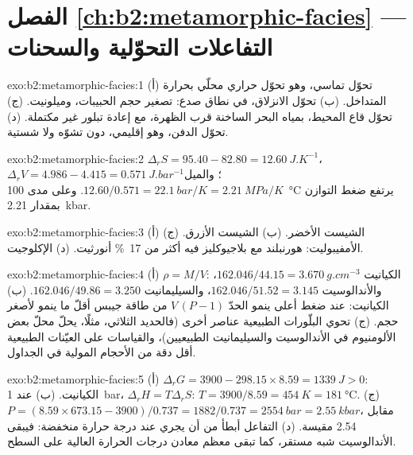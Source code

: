 \section*{الفصل \ref{ch:b2:metamorphic-facies} --- التفاعلات التحوّلية والسحنات}

\begin{solution}{exo:b2:metamorphic-facies:1}
(أ) تحوّل تماسي، وهو تحوّل حراري محلّي بحرارة المتداخل.
(ب) تحوّل الانزلاق، في نطاق صدع: تصغير حجم الحبيبات، وميلونيت.
(ج) تحوّل قاع المحيط، بمياه البحر الساخنة قرب الظهرة، مع إعادة تبلور
غير مكتملة. (د) تحوّل الدفن، وهو إقليمي، دون تشوّه ولا
شستية.
\end{solution}

\begin{solution}{exo:b2:metamorphic-facies:2}
$\Delta_r S = 95.40 - 82.80 = \qty{12.60}{J.K^{-1}}$، $\Delta_r V = 4.986 - 4.415 =
\qty{0.571}{J.bar^{-1}}$؛ والميل $12.60/0.571 = \qty{22.1}{bar/K} = \qty{2.21}{MPa/K}$.
وعلى مدى \qty{100}{\celsius} يرتفع ضغط التوازن بمقدار \qty{2.21}{kbar}.
\end{solution}

\begin{solution}{exo:b2:metamorphic-facies:3}
(أ) الشيست الأخضر. (ب) الشيست الأزرق. (ج) الأمفيبوليت: هورنبلند مع بلاجيوكليز فيه أكثر
من \qty{17}{\percent} أنورثيت. (د) الإكلوجيت.
\end{solution}

\begin{solution}{exo:b2:metamorphic-facies:4}
(أ) $\rho = M/V$: الكيانيت $162.046/44.15 = \qty{3.670}{g.cm^{-3}}$، والأندالوسيت
$162.046/51.52 = 3.145$، والسيليمانيت $162.046/49.86 = 3.250$. (ب) الكيانيت: عند ضغط
أعلى ينمو الحدّ $V\,(P - 1)$ من طاقة جيبس أقلّ ما ينمو لأصغر حجم.
(ج) تحوي البلّورات الطبيعية عناصر أخرى (فالحديد الثلاثي، مثلًا، يحلّ محلّ بعض
الألومنيوم في الأندالوسيت والسيليمانيت الطبيعيين)، والقياسات على العيّنات
الطبيعية أقل دقة من الأحجام المولية في الجداول.
\end{solution}

\begin{solution}{exo:b2:metamorphic-facies:5}
(أ) $\Delta_r G = 3900 - 298.15\times8.59 = \qty{+1339}{J} > 0$: الكيانيت. (ب) عند
\qty{1}{bar}، $\Delta_r H = T\Delta_r S$: $T = 3900/8.59 = \qty{454}{K} =
\qty{181}{\celsius}$. (ج) $P = (8.59\times673.15 - 3900)/0.737 = 1882/0.737 =
\qty{2554}{bar} = \qty{2.55}{kbar}$، مقابل 2.54 مقيسة. (د) التفاعل أبطأ من أن
يجري عند درجة حرارة منخفضة: فيبقى الأندالوسيت شبه مستقر، كما تبقى معظم معادن درجات الحرارة
العالية على السطح.
\end{solution}

